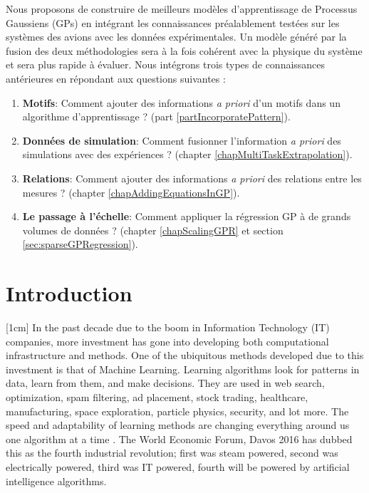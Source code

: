 \begin{mdframed}[hidealllines=true,backgroundcolor=lightgray!20]
Nous proposons de construire de meilleurs modèles d'apprentissage de Processus Gaussiens (GPs) en intégrant les connaissances préalablement testées sur les systèmes des avions avec les données expérimentales. Un modèle généré par la fusion des deux méthodologies sera à la fois cohérent avec la physique du système et sera plus rapide à évaluer. Nous intégrons trois types de connaissances antérieures en répondant aux questions suivantes :

\begin{enumerate}
\item \textbf{Motifs}: Comment ajouter des informations \textit{a priori} d'un motifs dans un algorithme d'apprentissage ? (part \ref{partIncorporatePattern}).
\item \textbf{Données de simulation}: Comment fusionner l'information \textit{a priori} des simulations avec des expériences ? (chapter \ref{chapMultiTaskExtrapolation}). 
\item \textbf{Relations}: Comment ajouter des informations \textit{a priori} des relations entre les mesures ? (chapter \ref{chapAddingEquationsInGP}).
\item \textbf{Le passage à l'échelle}: Comment appliquer la régression GP à de grands volumes de données ? (chapter \ref{chapScalingGPR} et section \ref{sec:sparseGPRegression}).
\end{enumerate}

\end{mdframed}



\section{Introduction}
[1cm]
In the past decade due to the boom in Information Technology (IT) companies, more investment has gone into developing both computational infrastructure and methods. One of the ubiquitous methods developed due to this investment is that of Machine Learning. Learning algorithms look for patterns in data, learn from them, and make decisions. They are used in web search, optimization, spam filtering, ad placement, stock trading, healthcare, manufacturing, space exploration, particle physics, security, and lot more. The speed and adaptability of learning methods are changing everything around us one algorithm at a time \cite{domingos2015master}. The World Economic Forum, Davos 2016 \cite{schwab2016fourth} has dubbed this as the fourth industrial revolution; first was steam powered, second was electrically powered, third was IT powered, fourth will be powered by artificial intelligence algorithms.

